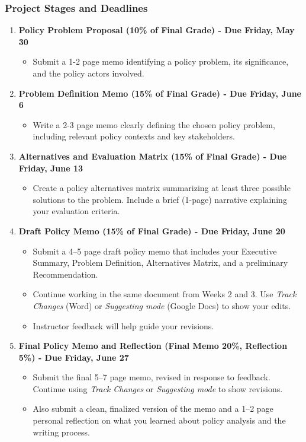 \documentclass[11pt, letterpaper]{article}
\begin{document}
\subsubsection*{Project Stages and Deadlines}
\begin{enumerate}
    \item \textbf{Policy Problem Proposal (10\% of Final Grade) - Due Friday, May 30} 
    \begin{itemize}
        \item Submit a 1-2 page memo identifying a policy problem, its significance, and the policy actors involved.
    \end{itemize}

    \item \textbf{Problem Definition Memo (15\% of Final Grade) - Due Friday, June 6}
    \begin{itemize}
        \item Write a 2-3 page memo clearly defining the chosen policy problem, including relevant policy contexts and key stakeholders.
    \end{itemize}

    \item \textbf{Alternatives and Evaluation Matrix (15\% of Final Grade) - Due Friday, June 13}
    \begin{itemize}
        \item Create a policy alternatives matrix summarizing at least three possible solutions to the problem. Include a brief (1-page) narrative explaining your evaluation criteria.
    \end{itemize}

    \item \textbf{Draft Policy Memo (15\% of Final Grade) - Due Friday, June 20}
    \begin{itemize}
        \item Submit a 4--5 page draft policy memo that includes your Executive Summary, Problem Definition, Alternatives Matrix, and a preliminary Recommendation.
        \item Continue working in the same document from Weeks 2 and 3. Use \emph{Track Changes} (Word) or \emph{Suggesting mode} (Google Docs) to show your edits.
        \item Instructor feedback will help guide your revisions.
    \end{itemize}

    \item \textbf{Final Policy Memo and Reflection (Final Memo 20\%, Reflection 5\%) - Due Friday, June 27}
    \begin{itemize}
        \item Submit the final 5--7 page memo, revised in response to feedback. Continue using \emph{Track Changes} or \emph{Suggesting mode} to show revisions.
        \item Also submit a clean, finalized version of the memo and a 1--2 page personal reflection on what you learned about policy analysis and the writing process.
    \end{itemize}

\end{enumerate}
\end{document}
